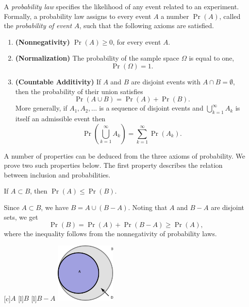 A \emph{probability law} specifies the likelihood of any event related to an experiment. 
Formally, a probability law assigns to every event $A$ a number $\Pr (A)$, called the \emph{probability of event $A$}, such that the following axioms are satisfied.
\begin{enumerate}
\item \textbf{(Nonnegativity)} $\Pr (A) \geq 0$, for every event $A$.
\item \textbf{(Normalization)} The probability of the sample space $\Omega$ is equal to one,
\begin{equation*}
\Pr (\Omega) = 1 .
\end{equation*}
\item \textbf{(Countable Additivity)} If $A$ and $B$ are disjoint events with $A \cap B = \emptyset$, then the probability of their union satisfies
\begin{equation*}
\Pr (A \cup B) = \Pr (A) + \Pr(B) .
\end{equation*}
More generally, if $A_1, A_2, \ldots$ is a sequence of disjoint events and $\bigcup_{k=1}^{\infty} A_k$ is itself an admissible event then
\begin{equation*}
\Pr \left( \bigcup_{k=1}^{\infty} A_k \right)
= \sum_{k = 1}^{\infty} \Pr (A_k) .
\end{equation*}
\end{enumerate}

A number of properties can be deduced from the three axioms of probability.
We prove two such properties below.
The first property describes the relation between inclusion and probabilities.
\begin{proposition}
If $A \subset B$, then $\Pr (A) \leq \Pr (B)$.
\end{proposition}
Since $A \subset B$, we have $B = A \cup (B - A)$.
Noting that $A$ and $B - A$ are disjoint sets, we get
\begin{equation*}
\Pr (B) = \Pr (A) + \Pr (B - A) \geq \Pr (A) ,
\end{equation*}
where the inequality follows from the nonnegativity of probability laws.

\begin{center}
\begin{psfrags}
[c]{$A$}
[l]{$B$}
[l]{$B - A$}
\includegraphics[height=3.03cm]{Figures/2Chapter/subset}
\end{psfrags}
\end{center}

